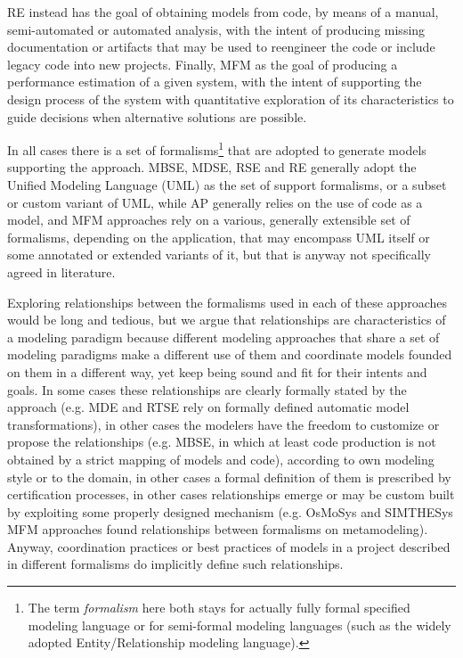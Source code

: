 RE instead has the goal of obtaining models from code, by means of a manual, semi-automated or automated analysis, with the intent of producing missing documentation or artifacts that may be used to reengineer the code or include legacy code into new projects. Finally, MFM as the goal of producing a performance estimation of a given system, with the intent of supporting the design process of the system with quantitative exploration of its characteristics to guide decisions when alternative solutions are possible.

In all cases there is a set of formalisms\footnote{The term \textit{formalism} here both stays for actually fully formal specified modeling language or for semi-formal modeling languages (such as the widely adopted Entity/Relationship modeling language).} that are adopted to generate models supporting the approach. MBSE, MDSE, RSE and RE generally adopt the Unified Modeling Language (UML) as the set of support formalisms, or a subset or custom variant of UML, while AP generally relies on the use of code as a model, and MFM approaches rely on a various, generally extensible set of formalisms, depending on the application, that may encompass UML itself or some annotated or extended variants of it, but that is anyway not specifically agreed in literature.

Exploring relationships between the formalisms used in each of these approaches would be long and tedious, but we argue that relationships are characteristics of a modeling paradigm because different modeling approaches that share a set of modeling paradigms make a different use of them and coordinate models founded on them in a different way, yet keep being sound and fit for their intents and goals. In some cases these relationships are clearly formally stated by the approach (e.g. MDE and RTSE rely on formally defined automatic model transformations), in other cases the modelers have the freedom to customize or propose the relationships (e.g. MBSE, in which at least code production is not obtained by a strict mapping of models and code), according to own modeling style or to the domain, in other cases a formal definition of them is prescribed by certification processes, in other cases relationships emerge or may be custom built by exploiting some properly designed mechanism (e.g. OsMoSys \cite{OsMoSys} and SIMTHESys \cite{SIMTHESys} MFM approaches found relationships between formalisms on metamodeling). Anyway, coordination practices or best practices of models in a project described in different formalisms do implicitly define such relationships.


